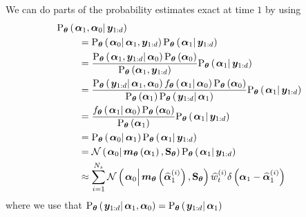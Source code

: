 \documentclass[9pt, notitlepage]{article}
\renewcommand{\vec}[1]{\bm{#1}}
\newcommand{\mat}[1]{\mathbf{#1}}
\newcommand{\Lparen}[1]{\left( #1\right)}
\newcommand{\Cond}[2]{\left. #1 \vphantom{#2} \right\vert  #2}
\newcommand{\Prob}{\text{P}}
\newcommand{\optor}[2]{#1\Lparen{#2}}
\newcommand{\optorC}[3]{\optor{#1}{\Cond{#2}{#3}}}
\newcommand{\dirac}[1]{\optor{\delta}{#1}}
\newcommand{\normalC}[3]{\optorC{\mathcal{N}}{#1}{#2,#3}}
\newcommand{\particS}[3]{\widehat{#1}_{#2}^{\Lparen{#3}}}
\newcommand{\nPart}{N}
\newcommand{\nPeriods}{d}
\begin{document}
We can do parts of the probability estimates exact at time $1$ by using%
%
\begin{equation}\begin{split}
\optorC{\Prob_{\vec{\theta}}}{\vec{\alpha}_1, \vec{\alpha}_0}{\vec{y}_{1:\nPeriods}} \hspace{-50pt} & \\
%
& = \optorC{\Prob_{\vec{\theta}}}{\vec{\alpha}_0}{\vec{\alpha}_1, \vec{y}_{1:\nPeriods}}
	\optorC{\Prob_{\vec{\theta}}}{\vec{\alpha}_1}{\vec{y}_{1:\nPeriods}} \\
%
& = \frac{
		\optorC{\Prob_{\vec{\theta}}}{\vec{\alpha}_1, \vec{y}_{1:\nPeriods}}{\vec{\alpha}_0}
		\optor{\Prob_{\vec{\theta}}}{\vec{\alpha}_0}
	}{ %
		\optor{\Prob_{\vec{\theta}}}{\vec{\alpha}_1, \vec{y}_{1:\nPeriods}}
	} %
	\optorC{\Prob_{\vec{\theta}}}{\vec{\alpha}_1}{\vec{y}_{1:\nPeriods}} \\
%
& = \frac{
		\optorC{\Prob_{\vec{\theta}}}{\vec{y}_{1:\nPeriods}}{\vec{\alpha}_1, \vec{\alpha}_0}
		\optorC{f_{\vec{\theta}}}{\vec{\alpha}_1}{\vec{\alpha}_0}
		\optor{\Prob_{\vec{\theta}}}{\vec{\alpha}_0}
	}{ %
		\optor{\Prob_{\vec{\theta}}}{\vec{\alpha}_1}
		\optorC{\Prob_{\vec{\theta}}}{\vec{y}_{1:\nPeriods}}{\vec{\alpha}_1}
	} %
	\optorC{\Prob_{\vec{\theta}}}{\vec{\alpha}_1}{\vec{y}_{1:\nPeriods}} \\
%
& = \frac{
		\optorC{f_{\vec{\theta}}}{\vec{\alpha}_1}{\vec{\alpha}_0}
		\optor{\Prob_{\vec{\theta}}}{\vec{\alpha}_0}
	}{ %
		\optor{\Prob_{\vec{\theta}}}{\vec{\alpha}_1}
	} %
	\optorC{\Prob_{\vec{\theta}}}{\vec{\alpha}_1}{\vec{y}_{1:\nPeriods}} \\
%
& = \optorC{\Prob_{\vec{\theta}}}{\vec{\alpha}_0}{\vec{\alpha}_1}
	\optorC{\Prob_{\vec{\theta}}}{\vec{\alpha}_1}{\vec{y}_{1:\nPeriods}} \\
%
& = \normalC{\vec{\alpha}_0}{
		\optor{\vec{m}_{\vec{\theta}}}{\vec{\alpha}_1}
	}{ %
		\mat{S}_{\vec{\theta}}
	}
	\optorC{\Prob_{\vec{\theta}}}{\vec{\alpha}_1}{\vec{y}_{1:\nPeriods}} \\
%
& \approx \sum_{i=1}^{\nPart_s}
	\normalC{\vec{\alpha}_0}{
		\optor{\vec{m}_{\vec{\theta}}}{\particS{\vec{\alpha}}{1}{i}}
	}{ %
		\mat{S}_{\vec{\theta}}
	}
	\particS{w}{t}{i}\dirac{\vec{\alpha}_1 - \particS{\vec{\alpha}}{1}{i}}
\end{split}\end{equation} %
%
%
where we use that %
$\optorC{\Prob_{\vec{\theta}}}{\vec{y}_{1:\nPeriods}}{\vec{\alpha}_1, \vec{\alpha}_0} = \optorC{\Prob_{\vec{\theta}}}{\vec{y}_{1:\nPeriods}}{\vec{\alpha}_1}$%
\end{document}

